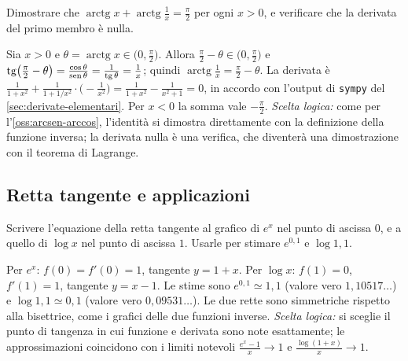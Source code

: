 \begin{esercizio}\label{es:arctg-1-su-x}
Dimostrare che $\operatorname{arctg}x+\operatorname{arctg}\frac1x=\frac\pi2$ per ogni $x>0$, e
verificare che la derivata del primo membro è nulla.
\begin{soluzione}
Sia $x>0$ e $\theta=\operatorname{arctg}x\in\bigl(0,\frac\pi2\bigr)$. Allora
$\frac\pi2-\theta\in\bigl(0,\frac\pi2\bigr)$ e
$\operatorname{tg}\bigl(\frac\pi2-\theta\bigr)=\frac{\cos\theta}{\operatorname{sen}\theta}=\frac1{\operatorname{tg}\theta}=\frac1x$; quindi
$\operatorname{arctg}\frac1x=\frac\pi2-\theta$. La derivata è
$\frac1{1+x^{2}}+\frac1{1+1/x^{2}}\cdot\bigl(-\frac1{x^{2}}\bigr)=\frac1{1+x^{2}}-\frac1{x^{2}+1}=0$, in
accordo con l'output di \texttt{sympy} del \cref{sec:derivate-elementari}. Per $x<0$ la somma
vale $-\frac\pi2$. \emph{Scelta logica:} come per l'\cref{oss:arcsen-arccos}, l'identità si
dimostra direttamente con la definizione della funzione inversa; la derivata nulla è una
verifica, che diventerà una dimostrazione con il teorema di Lagrange.
\end{soluzione}
\end{esercizio}

\subsection*{Retta tangente e applicazioni}

\begin{esercizio}
Scrivere l'equazione della retta tangente al grafico di $e^{x}$ nel punto di ascissa $0$, e
a quello di $\log x$ nel punto di ascissa $1$. Usarle per stimare $e^{0{,}1}$ e $\log1{,}1$.
\begin{soluzione}
Per $e^{x}$: $f(0)=f'(0)=1$, tangente $y=1+x$. Per $\log x$: $f(1)=0$, $f'(1)=1$, tangente
$y=x-1$. Le stime sono $e^{0{,}1}\simeq1{,}1$ (valore vero $1{,}10517\ldots$) e
$\log1{,}1\simeq0{,}1$ (valore vero $0{,}09531\ldots$). Le due rette sono simmetriche
rispetto alla bisettrice, come i grafici delle due funzioni inverse. \emph{Scelta logica:}
si sceglie il punto di tangenza in cui funzione e derivata sono note esattamente; le
approssimazioni coincidono con i limiti notevoli $\frac{e^{x}-1}x\to1$ e
$\frac{\log(1+x)}x\to1$.
\end{soluzione}
\end{esercizio}

